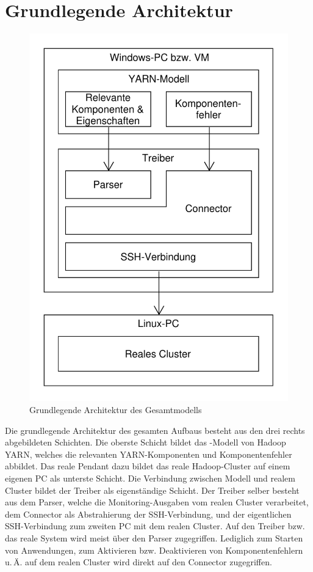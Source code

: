 \section{Grundlegende Architektur}\label{sec:architecture}

\begin{figure}
	\centering
	\includegraphics[width=0.5\columnwidth]{./images/modelArchitecture.pdf}
	\caption{Grundlegende Architektur des Gesamtmodells}
	\label{fig:modelArchitecture}
\end{figure}

Die grundlegende Architektur des gesamten Aufbaus besteht aus den drei rechts abgebildeten Schichten. Die oberste Schicht bildet das \sS-Modell von Hadoop YARN, welches die relevanten YARN-Komponenten und Komponentenfehler abbildet. Das reale Pendant dazu bildet das reale Hadoop-Cluster auf einem eigenen PC als unterste Schicht. Die Verbindung zwischen Modell und realem Cluster bildet der Treiber als eigenständige Schicht. Der Treiber selber besteht aus dem Parser, welche die Monitoring-Ausgaben vom realen Cluster verarbeitet, dem Connector als Abstrahierung der SSH-Verbindung, und der eigentlichen SSH-Verbindung zum zweiten PC mit dem realen Cluster. Auf den Treiber bzw. das reale System wird meist über den Parser zugegriffen. Lediglich zum Starten von Anwendungen, zum Aktivieren bzw. Deaktivieren von Komponentenfehlern u.\,Ä. auf dem realen Cluster wird direkt auf den Connector zugegriffen.